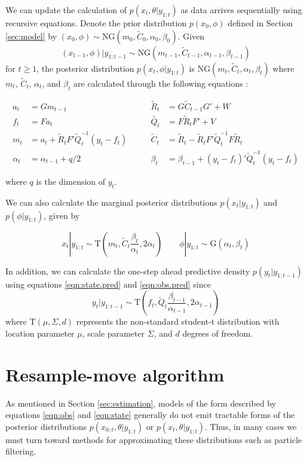 \documentclass{article}
\begin{document}
We can update the calculation of $p(x_t,\theta|y_{1:t})$ as data arrives sequentially using recursive equations. Denote the prior distribution $p(x_0, \phi)$ defined in Section \ref{sec:model} by $(x_0, \phi) \sim \mbox{NG}(m_0, \tilde{C}_0, \alpha_0, \beta_0)$. Given \[(x_{t-1},\phi)|y_{1:t-1} \sim \mbox{NG}(m_{t-1},\tilde{C}_{t-1}, \alpha_{t-1}, \beta_{t-1})\]
\noindent for $t \ge 1$, the posterior distribution $p(x_t,\phi|y_{1:t})$ is $\mbox{NG}(m_t,\tilde{C}_t,\alpha_t,\beta_t)$ where $m_t$, $\tilde{C}_t$, $\alpha_t$, and $\beta_t$ are calculated through the following equations \citep{petris2009dynamic}:

\begin{align}
a_t &= Gm_{t-1} &\qquad \tilde{R}_t &= G\tilde{C}_{t-1}G' + W \label{eqn:state.pred} \\
f_t &= Fa_t &\qquad \tilde{Q_t} &= F\tilde{R}_tF' + V \label{eqn:obs.pred} \\
m_t &= a_t + \tilde{R}_tF'\tilde{Q}_t^{-1}(y_t-f_t) &\qquad \tilde{C}_t &= \tilde{R}_t - \tilde{R}_tF'\tilde{Q}_t^{-1}F\tilde{R}_t \\
\alpha_t &= \alpha_{t-1} + q / 2 &\qquad \beta_t &= \beta_{t-1} + (y_t-f_t)'\tilde{Q}_t^{-1}(y_t-f_t)
\end{align}

\noindent where $q$ is the dimension of $y_t$.

We can also calculate the marginal posterior distributions $p(x_t|y_{1:t})$ and $p(\phi|y_{1:t})$, given by

\begin{equation}
x_t|y_{1:t} \sim \mbox{T}(m_t,\tilde{C}_t \frac{\beta_t}{\alpha_t},2\alpha_t) \qquad \phi|y_{1:t} \sim \mbox{G}(\alpha_t,\beta_t) \label{eqn:margpost}
\end{equation}

In addition, we can calculate the one-step ahead predictive density $p(y_t|y_{1:t-1})$ using equations \eqref{eqn:state.pred} and \eqref{eqn:obs.pred} since \[y_t|y_{1:t-1} \sim \mbox{T}(f_t,\tilde{Q}_t \frac{\beta_{t-1}}{\alpha_{t-1}},2\alpha_{t-1})\]
\noindent where $\mbox{T}(\mu,\Sigma,d)$ represents the non-standard student-t distribution with location parameter $\mu$, scale parameter $\Sigma$, and $d$ degrees of freedom.

\section{Resample-move algorithm} \label{sec:rm}

As mentioned in Section \ref{sec:estimation}, models of the form described by equations \eqref{eqn:obs} and \eqref{eqn:state} generally do not emit tractable forms of the posterior distributions $p(x_{0:t},\theta|y_{1:t})$ or $p(x_t,\theta|y_{1:t})$. Thus, in many cases we must turn toward methods for approximating these distributions such as particle filtering.
\end{document}

